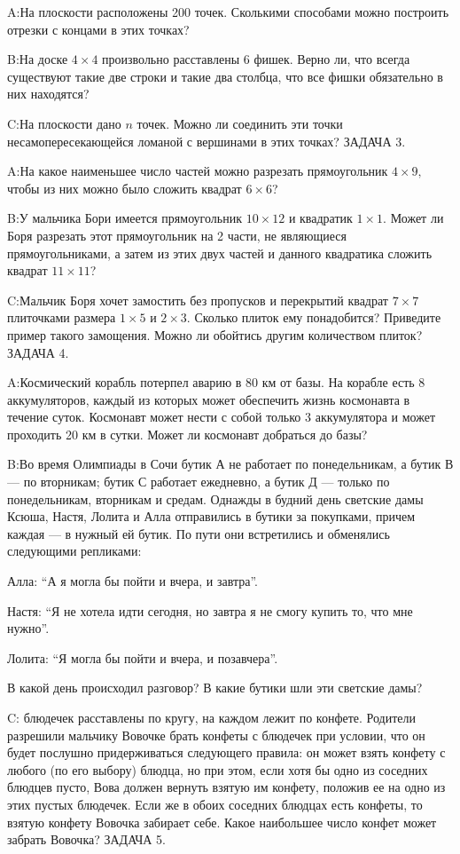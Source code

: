 \documentclass[10pt]{scrbook} \usepackage{modules/nonstahp_book}
\begin{document}
A:\qquad На плоскости расположены 200 точек. Сколькими способами можно построить отрезки с концами в этих точках?

B:\qquad На доске $4\times 4$ произвольно расставлены 6 фишек. Верно ли, что всегда существуют такие две строки и такие два столбца, что все фишки обязательно в них находятся?

C:\qquad На плоскости дано $n$ точек. Можно ли соединить эти точки несамопересекающейся ломаной с вершинами в этих точках?
\medbreak
\noindent
ЗАДАЧА 3.

A:\qquad На какое наименьшее число частей можно разрезать прямоугольник $4\times 9,$ чтобы из них можно было сложить квадрат $6\times 6$?

B:\qquad У мальчика Бори имеется прямоугольник $10\times 12$ и квадратик $1\times 1.$ Может ли Боря разрезать этот прямоугольник на 2 части, не являющиеся прямоугольниками, а затем из этих двух частей и данного квадратика сложить квадрат $11\times 11$?

C:\qquad Мальчик Боря хочет замостить без пропусков и перекрытий квадрат $7\times 7$ плиточками размера $1\times 5$ и $2\times 3.$ Сколько плиток ему понадобится? Приведите пример такого замощения.  Можно ли обойтись другим количеством плиток?
\medbreak
\noindent
ЗАДАЧА 4. 

A:\qquad Космический корабль потерпел аварию в 80 км от базы. На корабле есть 8 аккумуляторов, каждый из которых может обеспечить жизнь космонавта в течение суток. Космонавт может нести с собой только 3 аккумулятора и может проходить 20 км в сутки. Может ли космонавт добраться до базы?

B:\qquad Во время Олимпиады в Сочи бутик А не работает по понедельникам, а бутик В --- по вторникам; бутик С работает ежедневно, а бутик Д --- только по понедельникам, вторникам и средам. Однажды в будний день светские дамы  Ксюша, Настя, Лолита и Алла отправились в бутики за покупками, причем каждая --- в нужный ей бутик. По пути они встретились и обменялись следующими репликами:

Алла: ``А я могла бы пойти и вчера, и завтра''.\par
Настя: ``Я не хотела идти сегодня, но завтра я не смогу купить то, что мне нужно''.\par
Лолита: ``Я могла бы пойти и вчера, и позавчера''.

\noindent
В какой день происходил разговор? В какие бутики шли эти светские дамы?
 
C: блюдечек расставлены по кругу, на каждом лежит по конфете. Родители разрешили мальчику Вовочке брать конфеты с блюдечек при условии, что он будет послушно придерживаться следующего правила: он может взять конфету с любого (по его выбору) блюдца, но при этом, если хотя бы одно из соседних блюдцев пусто, Вова должен вернуть взятую им конфету, положив ее на одно из этих пустых блюдечек. Если же в обоих соседних блюдцах есть конфеты, то взятую конфету Вовочка забирает себе. Какое наибольшее число конфет может забрать Вовочка?
\medbreak
\noindent
ЗАДАЧА 5. 
\end{document}
